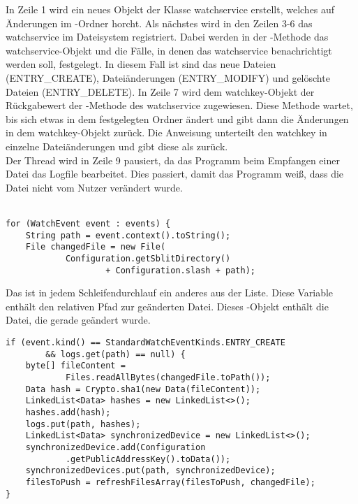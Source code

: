 In Zeile 1 wird ein neues Objekt der Klasse \gls{watchservice} erstellt, welches auf Änderungen im \sblit-Ordner horcht. Als nächstes wird in den Zeilen 3-6 das \gls{watchservice} im Dateisystem registriert. Dabei werden in der -Methode das \gls{watchservice}-Objekt und die Fälle, in denen das \gls{watchservice} benachrichtigt werden soll, festgelegt. In diesem Fall ist sind das neue Dateien (ENTRY\_CREATE), Dateiänderungen (ENTRY\_MODIFY) und gelöschte Dateien (ENTRY\_DELETE). In Zeile 7 wird dem \gls{watchkey}-Objekt der Rückgabewert der -Methode des \gls{watchservice} zugewiesen. Diese Methode wartet, bis sich etwas in dem festgelegten Ordner ändert und gibt dann die Änderungen in dem \gls{watchkey}-Objekt zurück. Die Anweisung  unterteilt den \gls{watchkey} in einzelne Dateiänderungen und gibt diese als  zurück. \\ 
Der Thread wird in Zeile 9 pausiert, da das Programm beim Empfangen einer Datei das Logfile bearbeitet. Dies passiert, damit das Programm weiß, dass die Datei nicht vom Nutzer verändert wurde. \\ \\
\javalisting
\begin{minipage}{\linewidth}
\begin{lstlisting}[caption={Unterteilen in einzelne Dateien},captionpos=b]
for (WatchEvent event : events) {
	String path = event.context().toString();
	File changedFile = new File(
			Configuration.getSblitDirectory()
					+ Configuration.slash + path);
\end{lstlisting}
\end{minipage}
\begin{description}
	Das  ist in jedem Schleifendurchlauf ein anderes aus der Liste. 
	Diese Variable enthält den relativen Pfad zur geänderten Datei.
	Dieses -Objekt enthält die Datei, die gerade geändert wurde.
\end{description}
\javalisting
\begin{minipage}{\linewidth}
\begin{lstlisting}[caption={Erstellen einer Datei},captionpos=b]
if (event.kind() == StandardWatchEventKinds.ENTRY_CREATE 
		&& logs.get(path) == null) {
	byte[] fileContent = 
			Files.readAllBytes(changedFile.toPath());
	Data hash = Crypto.sha1(new Data(fileContent));
	LinkedList<Data> hashes = new LinkedList<>();
	hashes.add(hash);
	logs.put(path, hashes);
	LinkedList<Data> synchronizedDevice = new LinkedList<>();
	synchronizedDevice.add(Configuration
			.getPublicAddressKey().toData());
	synchronizedDevices.put(path, synchronizedDevice);
	filesToPush = refreshFilesArray(filesToPush, changedFile);
}
\end{lstlisting}
\end{minipage}	
